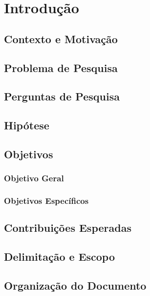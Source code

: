 \chapter{Introdução}

\section{Contexto e Motivação}

\section{Problema de Pesquisa}

\section{Perguntas de Pesquisa}

\section{Hipótese}

\section{Objetivos}

\subsection{Objetivo Geral}

\subsection{Objetivos Específicos}


\section{Contribuições Esperadas}

\section{Delimitação e Escopo}

\section{Organização do Documento}

